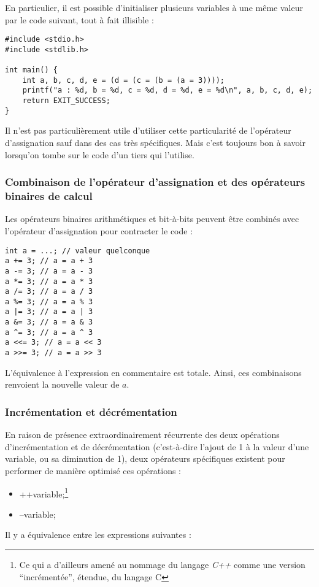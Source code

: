 \documentclass[../../../main.tex]{subfiles}
\begin{document}
En particulier, il est possible d'initialiser plusieurs variables à une même valeur par le code suivant, tout à fait illisible :
\begin{verbatim}
#include <stdio.h>
#include <stdlib.h>

int main() {
	int a, b, c, d, e = (d = (c = (b = (a = 3))));
	printf("a : %d, b = %d, c = %d, d = %d, e = %d\n", a, b, c, d, e);
	return EXIT_SUCCESS;
}
\end{verbatim}
Il n'est pas particulièrement utile d'utiliser cette particularité de l'opérateur d'assignation sauf dans des cas très spécifiques. Mais c'est toujours bon à savoir lorsqu'on tombe sur le code d'un tiers qui l'utilise.
 
\subsubsection{Combinaison de l'opérateur d'assignation et des opérateurs binaires de calcul}
 
Les opérateurs binaires arithmétiques et bit-à-bits peuvent être combinés avec l'opérateur d'assignation pour contracter le code :
\begin{verbatim}
int a = ...; // valeur quelconque
a += 3; // a = a + 3
a -= 3; // a = a - 3
a *= 3; // a = a * 3
a /= 3; // a = a / 3
a %= 3; // a = a % 3
a |= 3; // a = a | 3
a &= 3; // a = a & 3
a ^= 3; // a = a ^ 3
a <<= 3; // a = a << 3
a >>= 3; // a = a >> 3
\end{verbatim}
L'équivalence à l'expression en commentaire est totale. Ainsi, ces combinaisons renvoient la nouvelle valeur de $a$.
 
\subsubsection{Incrémentation et décrémentation}
 
En raison de présence extraordinairement récurrente des deux opérations d'incrémentation et de décrémentation (c'est-à-dire l'ajout de 1 à la valeur d'une variable, ou sa diminution de 1), deux opérateurs spécifiques existent pour performer de manière optimisé ces opérations :
\begin{itemize}
	\item \textsf{++variable;}\footnote{Ce qui a d'ailleurs amené au nommage du langage \textit{C++} comme une version ``incrémentée'', étendue, du langage C}
	\item \textsf{--variable;}
\end{itemize}
Il y a équivalence entre les expressions suivantes :
 
\end{document}
